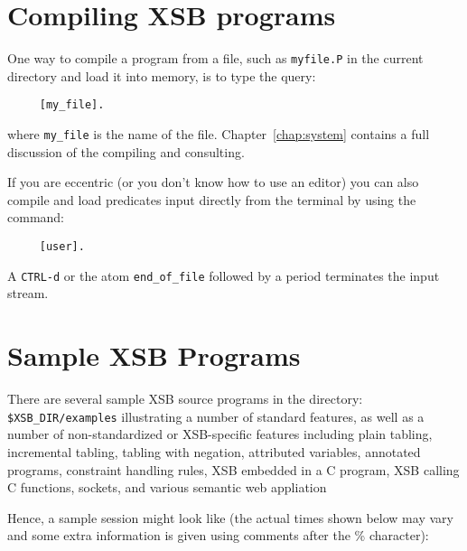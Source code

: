 \section{Compiling XSB programs}

One way to compile a program from a file, such as {\tt myfile.P} in
the current directory and load it into memory, is to type the query:
\begin{verbatim}
     [my_file].
\end{verbatim}
where \verb'my_file' is the name of the file.
Chapter~\ref{chap:system} contains a full discussion of the compiling
and consulting.

If you are eccentric (or you don't know how to use an editor) you can also 
compile and load predicates input directly from the terminal by using the
command:
\begin{verbatim}
     [user].
\end{verbatim}
A {\tt CTRL-d} or the atom \verb'end_of_file' followed by a period 
terminates the input stream.


\section{Sample XSB Programs}

There are several sample XSB source programs in the directory: {\tt
  \$XSB\_DIR/examples} illustrating a number of standard features, as
well as a number of non-standardized or XSB-specific features
including plain tabling, incremental tabling, tabling with negation,
attributed variables, annotated programs, constraint handling rules,
XSB embedded in a C program, XSB calling C functions, sockets, and
various semantic web appliation

Hence, a sample session might look like
(the actual times shown below may vary and some extra information is given
using comments after the \% character):

